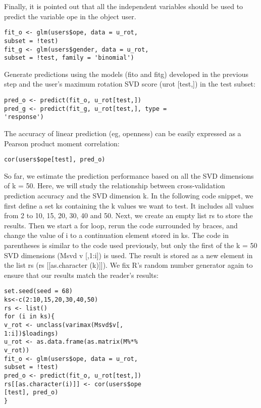 Finally, it is pointed out that all the independent variables 
should be used to predict the variable ope in the object user.

\begin{verbatim}
fit_o <- glm(users$ope, data = u_rot,
subset = !test)
fit_g <- glm(users$gender, data = u_rot,
subset = !test, family = 'binomial')
\end{verbatim}

Generate predictions using the models (fito and fitg) developed in
 the previous step and the user's maximum rotation SVD score 
(urot [test,]) in the test subset:

\begin{verbatim}
pred_o <- predict(fit_o, u_rot[test,])
pred_g <- predict(fit_g, u_rot[test,], type =
'response')
\end{verbatim}

The accuracy of linear prediction (eg, openness) can be easily 
expressed as a Pearson product moment correlation:

\begin{verbatim}
cor(users$ope[test], pred_o)
\end{verbatim}

So far, we estimate the prediction performance based on all the SVD
 dimensions of k = 50. Here, we will study the relationship between
 cross-validation prediction accuracy and the SVD dimension k. In 
the following code snippet, we first define a set ks containing the
 k values we want to test. It includes all values from 2 to 10, 15,
 20, 30, 40 and 50. Next, we create an empty list rs to store the 
results. Then we start a for loop, rerun the code surrounded by 
braces, and change the value of i to a continuation element stored
 in ks. The code in parentheses is similar to the code used 
previously, but only the first of the k = 50 SVD dimensions (Msvd 
 v [,1:i]) is used. The result is stored as a new element in the 
list rs (rs [[as.character (k)]]). We fix R's random number generator
 again to ensure that our results match the reader's results:

\begin{verbatim}
set.seed(seed = 68)
ks<-c(2:10,15,20,30,40,50)
rs <- list()
for (i in ks){
v_rot <- unclass(varimax(Msvd$v[,
1:i])$loadings)
u_rot <- as.data.frame(as.matrix(M%*%
v_rot))
fit_o <- glm(users$ope, data = u_rot,
subset = !test)
pred_o <- predict(fit_o, u_rot[test,])
rs[[as.character(i)]] <- cor(users$ope
[test], pred_o)
}
\end{verbatim}


